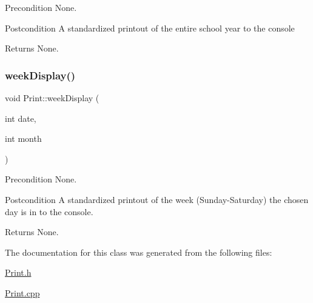 \begin{DoxyPrecond}{Precondition}
None. 
\end{DoxyPrecond}
\begin{DoxyPostcond}{Postcondition}
A standardized printout of the entire school year to the console 
\end{DoxyPostcond}
\begin{DoxyReturn}{Returns}
None. 
\end{DoxyReturn}
\hypertarget{class_print_a7013b300e4a36e6cd2fa8c68eab71892}{}\label{class_print_a7013b300e4a36e6cd2fa8c68eab71892} 
\subsubsection{\texorpdfstring{week\+Display()}{weekDisplay()}}
{\footnotesize\ttfamily void Print\+::week\+Display (\begin{DoxyParamCaption}\item[{int}]{date,  }\item[{int}]{month }\end{DoxyParamCaption})}

\begin{DoxyPrecond}{Precondition}
None. 
\end{DoxyPrecond}
\begin{DoxyPostcond}{Postcondition}
A standardized printout of the week (Sunday-\/\+Saturday) the chosen day is in to the console. 
\end{DoxyPostcond}
\begin{DoxyReturn}{Returns}
None. 
\end{DoxyReturn}


The documentation for this class was generated from the following files\+:\begin{DoxyCompactItemize}
\item 
\hyperlink{_print_8h}{Print.\+h}\item 
\hyperlink{_print_8cpp}{Print.\+cpp}\end{DoxyCompactItemize}
